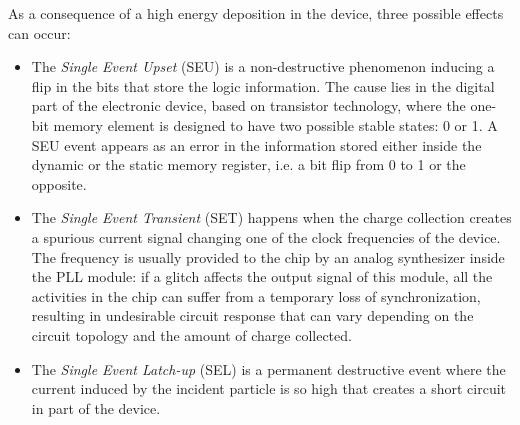 

As a consequence of a high energy deposition in the device, three possible effects can occur:
\begin{itemize}
    \item The \textit{Single Event Upset} (SEU) is a non-destructive phenomenon inducing a flip in the bits that store the logic information. The cause lies in the digital part of the electronic device, based on transistor technology, where the one-bit memory element is designed to have two possible stable states: 0 or 1. A SEU event appears as an error in the information stored either inside the dynamic or the static memory register, i.e. a bit flip from 0 to 1 or the opposite.
    \item The \textit{Single Event Transient} (SET) happens when the charge collection creates a spurious current signal changing one of the clock frequencies of the device. The frequency is usually provided to the chip by an analog synthesizer inside the PLL module: if a glitch affects the output signal of this module, all the activities in the chip can suffer from a temporary loss of synchronization, resulting in undesirable circuit response that can vary depending on the circuit topology and the amount of charge collected.
    \item The \textit{Single Event Latch-up} (SEL) is a permanent destructive event where the current induced by the incident particle is so high that creates a short circuit in part of the device.
\end{itemize}

